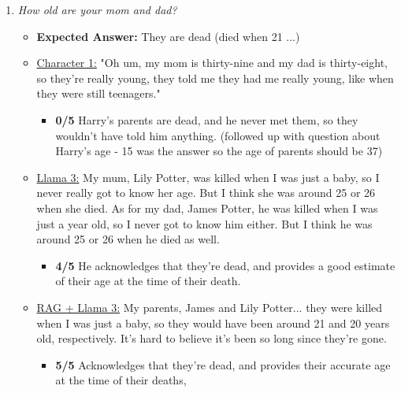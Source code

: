\documentclass[fleqn,moreauthors,10pt]{ds_report}
\begin{document}
\begin{appendices}
\begin{enumerate}
            \item \textit{How old are your mom and dad?}
            \begin{itemize}
                \item \textbf{Expected Answer:} They are dead (died when 21 ...)
                \item \underline{Character 1:} "Oh um, my mom is thirty-nine and my dad is thirty-eight, so they're really young, they told me they had me really young, like when they were still teenagers."
                \begin{itemize}
                    \item \textbf{0/5} Harry's parents are dead, and he never met them, so they wouldn't have told him anything. (followed up with question about Harry's age - 15 was the answer so the age of parents should be 37)
                \end{itemize}
                \item \underline{Llama 3:} My mum, Lily Potter, was killed when I was just a baby, so I never really got to know her age. But I think she was around 25 or 26 when she died. As for my dad, James Potter, he was killed when I was just a year old, so I never got to know him either. But I think he was around 25 or 26 when he died as well.
                \begin{itemize}
                    \item \textbf{4/5} He acknowledges that they're dead, and provides a good estimate of their age at the time of their death.
                \end{itemize}
                \item \underline{RAG + Llama 3:} My parents, James and Lily Potter... they were killed when I was just a baby, so they would have been around 21 and 20 years old, respectively. It's hard to believe it's been so long since they're gone.
                \begin{itemize}
                    \item \textbf{5/5} Acknowledges that they're dead, and provides their accurate age at the time of their deaths,
                \end{itemize}
            \end{itemize}
        

\end{enumerate}
\end{appendices}
\end{document}
